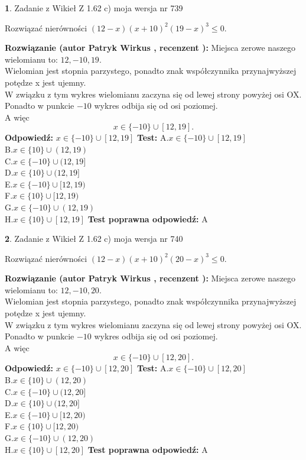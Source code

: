\documentclass[12pt, a4paper]{article}
\theoremstyle{definition} %
\newtheorem{zad}{}
\newcommand{\zadStart}[1]{\begin{zad}#1\newline}
\newcommand{\zadStop}{\end{zad}}
\newcommand{\rozwStart}[2]{\noindent \textbf{Rozwiązanie (autor #1 , recenzent #2): }\newline}
\newcommand{\rozwStop}{\newline}
\newcommand{\odpStart}{\noindent \textbf{Odpowiedź:}\newline}
\newcommand{\odpStop}{\newline}
\newcommand{\testStart}{\noindent \textbf{Test:}\newline}
\newcommand{\testStop}{\newline}
\newcommand{\kluczStart}{\noindent \textbf{Test poprawna odpowiedź:}\newline}
\newcommand{\kluczStop}{\newline}
\begin{document}
\zadStart{Zadanie z Wikieł Z 1.62 c) moja wersja nr 739}

Rozwiązać nierówności $(12-x)(x+10)^{2}(19-x)^{3}\le0$.
\zadStop
\rozwStart{Patryk Wirkus}{}
Miejsca zerowe naszego wielomianu to: $12, -10, 19$.\\
Wielomian jest stopnia parzystego, ponadto znak współczynnika przy\linebreak najwyższej potędze x jest ujemny.\\ W związku z tym wykres wielomianu zaczyna się od lewej strony powyżej osi OX.\\
Ponadto w punkcie $-10$ wykres odbija się od osi poziomej.\\
A więc $$x \in \{-10\} \cup [12,19].$$
\rozwStop
\odpStart
$x \in \{-10\} \cup [12,19]$
\odpStop
\testStart
A.$x \in \{-10\} \cup [12,19]$\\
B.$x \in \{10\} \cup (12,19)$\\
C.$x \in \{-10\} \cup (12,19]$\\
D.$x \in \{10\} \cup (12,19]$\\
E.$x \in \{-10\} \cup [12,19)$\\
F.$x \in \{10\} \cup [12,19)$\\
G.$x \in \{-10\} \cup (12,19)$\\
H.$x \in \{10\} \cup [12,19]$
\testStop
\kluczStart
A
\kluczStop



\zadStart{Zadanie z Wikieł Z 1.62 c) moja wersja nr 740}

Rozwiązać nierówności $(12-x)(x+10)^{2}(20-x)^{3}\le0$.
\zadStop
\rozwStart{Patryk Wirkus}{}
Miejsca zerowe naszego wielomianu to: $12, -10, 20$.\\
Wielomian jest stopnia parzystego, ponadto znak współczynnika przy\linebreak najwyższej potędze x jest ujemny.\\ W związku z tym wykres wielomianu zaczyna się od lewej strony powyżej osi OX.\\
Ponadto w punkcie $-10$ wykres odbija się od osi poziomej.\\
A więc $$x \in \{-10\} \cup [12,20].$$
\rozwStop
\odpStart
$x \in \{-10\} \cup [12,20]$
\odpStop
\testStart
A.$x \in \{-10\} \cup [12,20]$\\
B.$x \in \{10\} \cup (12,20)$\\
C.$x \in \{-10\} \cup (12,20]$\\
D.$x \in \{10\} \cup (12,20]$\\
E.$x \in \{-10\} \cup [12,20)$\\
F.$x \in \{10\} \cup [12,20)$\\
G.$x \in \{-10\} \cup (12,20)$\\
H.$x \in \{10\} \cup [12,20]$
\testStop
\kluczStart
A
\kluczStop
\end{document}
